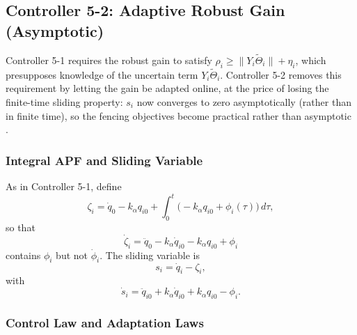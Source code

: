 \subsection{Controller 5-2: Adaptive Robust Gain (Asymptotic)}
\label{sec: controller5-2}

Controller 5-1 requires the robust gain to satisfy
$\rho_i \ge \|Y_i\tilde{\Theta}_i\| + \eta_i$, which presupposes knowledge of the uncertain
term $Y_i\tilde{\Theta}_i$. Controller 5-2 removes this requirement by letting the gain be
adapted online, at the price of losing the finite-time sliding property: $s_i$ now converges
to zero asymptotically (rather than in finite time), so the fencing objectives become
practical rather than asymptotic \cite{slotineLiAppliedNonlinearControl1991}.

\subsubsection{Integral APF and Sliding Variable}

As in Controller 5-1, define
\begin{equation}\label{eq5-2:zeta}
	\zeta_i = \dot{q}_0 - k_\alpha q_{i0}
	+ \int_0^t \bigl(-k_\alpha q_{i0} + \phi_i(\tau)\bigr)\,d\tau,
\end{equation}
so that
\begin{equation}\label{eq5-2:zeta_dot}
	\dot{\zeta}_i = \ddot{q}_0 - k_\alpha \dot{q}_{i0} - k_\alpha q_{i0} + \phi_i
\end{equation}
contains $\phi_i$ but not $\dot{\phi}_i$. The sliding variable is
\begin{equation}\label{eq5-2:sliding_var}
	s_i = \dot{q}_i - \zeta_i,
\end{equation}
with
\begin{equation}\label{eq5-2:s_dot_def}
	\dot{s}_i = \ddot{q}_{i0} + k_\alpha \dot{q}_{i0} + k_\alpha q_{i0} - \phi_i.
\end{equation}

\subsubsection{Control Law and Adaptation Laws}

